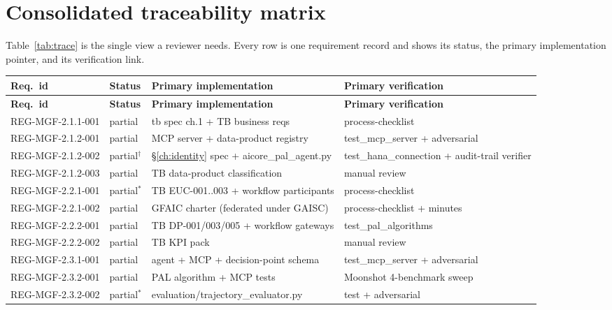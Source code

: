 \documentclass[11pt,a4paper,twoside]{report}
\begin{document}
\section{Consolidated traceability matrix}

Table~\ref{tab:trace} is the single view a reviewer needs. Every row is
one requirement record and shows its status, the primary implementation
pointer, and its verification link.

\footnotesize
\setlength{\tabcolsep}{4pt}
\begin{longtable}{p{3.5cm}p{1.6cm}p{4.6cm}p{3.6cm}}
\toprule
\textbf{Req.\ id} & \textbf{Status} & \textbf{Primary implementation} & \textbf{Primary verification} \\
\midrule
\endfirsthead
\toprule
\textbf{Req.\ id} & \textbf{Status} & \textbf{Primary implementation} & \textbf{Primary verification} \\
\midrule
\endhead
REG-MGF-2.1.1-001 & partial       & tb spec ch.1 + TB business reqs             & process-checklist \\
REG-MGF-2.1.2-001 & partial       & MCP server + data-product registry          & test\_mcp\_server + adversarial \\
REG-MGF-2.1.2-002 & partial$^\dagger$ & \S\ref{ch:identity} spec + aicore\_pal\_agent.py & test\_hana\_connection + audit-trail verifier \\
REG-MGF-2.1.2-003 & partial       & TB data-product classification              & manual review \\
REG-MGF-2.2.1-001 & partial$^*$   & TB EUC-001..003 + workflow participants     & process-checklist \\
REG-MGF-2.2.1-002 & partial       & GFAIC charter (federated under GAISC)       & process-checklist + minutes \\
REG-MGF-2.2.2-001 & partial       & TB DP-001/003/005 + workflow gateways       & test\_pal\_algorithms \\
REG-MGF-2.2.2-002 & partial       & TB KPI pack                                 & manual review \\
REG-MGF-2.3.1-001 & partial       & agent + MCP + decision-point schema         & test\_mcp\_server + adversarial \\
REG-MGF-2.3.2-001 & partial       & PAL algorithm + MCP tests                   & Moonshot 4-benchmark sweep \\
REG-MGF-2.3.2-002 & partial$^*$   & evaluation/trajectory\_evaluator.py         & test + adversarial \\

\end{longtable}
\end{document}
